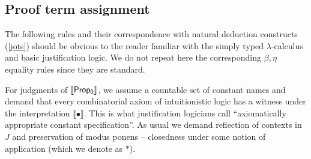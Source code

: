 \subsection{Proof term assignment}
\label{basicpras}
The following rules and their correspondence with natural deduction  constructs (\ref{jots}) should be obvious to the reader familiar with the simply typed  $\lambda$-calculus and basic justification logic.
We do not repeat here the corresponding $\beta, \eta$ equality rules since they are standard.
    
    For  judgments of ${\sf \llbracket Prop_0\rrbracket}$, we assume a countable set of constant names and demand that every combinatorial
    axiom of intuitionistic logic has  a witness under the interpretation 
    $\llbracket\bullet\rrbracket$. This is what justification logicians call ``axiomatically appropriate constant specification''.
    As usual we demand reflection of contexts in $J$
    and preservation of modus ponens -- closedness under some notion of application (which we denote as $*$).
    
    
